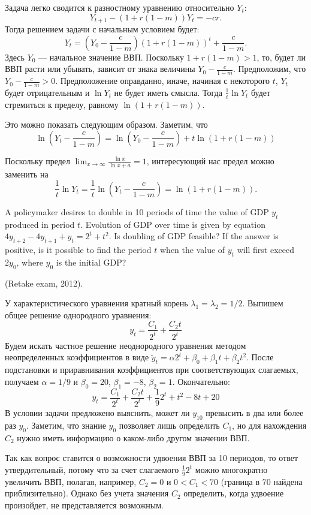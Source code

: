 \begin{solution}
Задача легко сводится к разностному уравнению относительно   $Y_t$: 
\[
Y_{t+1}-(1+r(1-m))Y_t=-cr.
\]
Тогда решением задачи с начальным условием будет:
\[
Y_t=\left(  Y_0-\frac{c}{1-m} \right) (1+r(1-m))^t + \frac{c}{1-m} .
\]
Здесь   $Y_0$ --- начальное значение ВВП. Поскольку  $1+r(1-m)>1$, то, будет ли ВВП расти или убывать, зависит от знака величины $Y_0-\frac{c}{1-m}$. Предположим, что $Y_0-\frac{c}{1-m}>0$. Предположение оправданно, иначе, начиная с некоторого $t$, $Y_t$ будет отрицательным и $\ln Y_t$  не будет иметь смысла.  Тогда  $\frac{1}{t}\ln Y_t$  будет стремиться к пределу, равному  $\ln (1+r(1-m))$.

Это можно показать следующим образом. Заметим, что
\[
\ln \left( Y_t - \frac{c}{1-m} \right) = \ln \left(  Y_0-\frac{c}{1-m} \right) +t \ln (1+r(1-m))
\]  

Поскольку предел $\lim_{x\to\infty} \frac{\ln x}{\ln x+a}=1$, интересующий нас предел можно заменить на
\[
\frac{1}{t}\ln Y_t=\frac{1}{t} \ln \left( Y_t - \frac{c}{1-m} \right)=\ln (1+r(1-m)).
\]

\end{solution}



\begin{problem}
A policymaker desires to double in 10 periods of time the value of GDP $y_t$  produced in period $t$. Evolution of GDP over time is given by equation $4y_{t+2}-4y_{t+1}+y_t=2^t+t^2$. Is doubling of GDP feasible? If the answer is positive, is it possible to find the period $t$ when the value of $y_t$  will first exceed $2y_0$, where $y_0$ is the initial GDP?

(Retake exam, 2012).
\end{problem}

\begin{solution}
У характеристического уравнения кратный корень $\lambda_1=\lambda_2=1/2$. Выпишем общее решение однородного уравнения:
\[
y_t=\frac{C_1}{2^t}+\frac{C_2 t}{2^t}
\]
Будем искать частное решение неоднородного уравнения методом неопределенных коэффициентов в виде  $\tilde{y}_t=\alpha 2^t +\beta_0 + \beta_1 t+ \beta_2 t^2$. После подстановки и приравнивания коэффициентов при соответствующих слагаемых, получаем  $\alpha=1/9$ и $\beta_0=20$, $\beta_1=-8$, $\beta_2=1$. Окончательно: 
\[
y_t=\frac{C_1}{2^t}+\frac{C_2 t}{2^t}+\frac{1}{9}2^t + t^2-8t+20
\]
В условии задачи предложено выяснить, может ли  $y_{10}$ превысить в два или более раз  $y_0$. Заметим, что знание  $y_0$ позволяет лишь определить  $C_1$, но для нахождения  $C_2$ нужно иметь информацию о каком-либо другом значении ВВП. 

Так как вопрос ставится о возможности удвоения ВВП за 10 периодов, то ответ утвердительный, потому что за счет слагаемого  $\frac{1}{9}2^t$ можно многократно увеличить ВВП, полагая, например, $C_2=0$   и $0<C_1<70$  (граница в 70 найдена приблизительно). Однако без учета значения $C_2$  определить, когда удвоение произойдет, не представляется возможным.
\end{solution}


